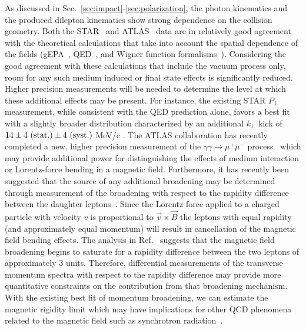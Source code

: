 \documentclass[twocolumn,epjc3]{svjour3}\sloppy
\begin{document}
As discussed in Sec.~\ref{sec:impact}-\ref{sec:polarization}, the photon kinematics and the produced dilepton kinematics show strong dependence on the collision geometry.
Both the STAR~\cite{starcollaborationProductionEnsuremathPairs2004} and ATLAS~\cite{atlascollaborationObservationCentralityDependentAcoplanarity2018a} data are in relatively good agreement with the theoretical calculations that take into account the spatial dependence of the fields (gEPA~\cite{zhaInitialTransversemomentumBroadening2020b}, QED~\cite{zhaInitialTransversemomentumBroadening2020b,liImpactParameterDependence2020}, and Wigner function formalisms~\cite{klusek-gawendaCentralityDependenceDilepton2021,kleinLeptonPairProduction2020a,Wang:2021kxm}).
Considering the good agreement with these calculations that include the vacuum process only, room for any such medium induced or final state effects is significantly reduced. 
Higher precision measurements will be needed to determine the level at which these additional effects may be present. 
For instance, the existing STAR $P_\perp$ measurement, while consistent with the QED prediction alone, favors a best fit with a slightly broader distribution characterized by an additional $k_\perp$ kick of $14\pm4 {\rm\ (stat.)} \pm4 {\rm\ (syst.)}$ MeV/c .
The ATLAS collaboration has recently completed a new, higher precision measurement of the $\gamma\gamma \rightarrow \mu^+\mu^-$ process~\cite{atlascollaborationExclusiveDimuonProduction2020} which may provide additional power for distinguishing the effects of medium interaction or Lorentz-force bending in a magnetic field. 
Furthermore, it has recently been suggested that the source of any additional broadening may be determined 
through measurement of the broadening with respect to the rapidity difference between the daughter leptons~\cite{kleinLeptonPairProduction2020a}.
Since the Lorentz force applied to a charged particle with velocity $v$ is proportional to $\vec{v} \times \vec{B}$ the leptons with equal rapidity (and approximately equal momentum) will result in cancellation of the magnetic field bending effects. The analysis in Ref.~\cite{kleinLeptonPairProduction2020a} suggests that the magnetic field broadening begins to saturate for a rapidity difference between the two leptons of approximately 3 units. Therefore, differential measurements of the transverse momentum spectra with respect to the rapidity difference may provide more quantitative constraints on the contribution from that broadening mechanism.
With the existing best fit of momentum broadening, we can estimate the magnetic rigidity limit which may have implications for other QCD phenomena related to the magnetic field such as synchrotron radiation~\cite{TuchinPhysRevC.82.034904}. 
\end{document}
